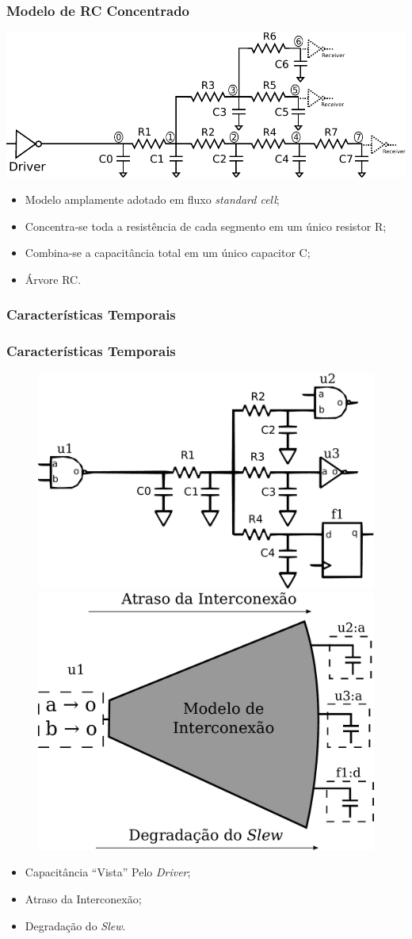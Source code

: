 \documentclass[10pt,a4paper]{beamer}
\begin{document}
				\begin{frame}
					\frametitle{Modelo de RC Concentrado}
					\begin{center}
						\includegraphics[width=\textwidth]{img/lumped_rc.pdf} 
					\end{center}
					\begin{itemize}
						\item Modelo amplamente adotado em fluxo \textit{standard cell};
						\item Concentra-se toda a resistência de cada segmento  em um único resistor R;
						\item Combina-se a capacitância total em um único capacitor C;
						\item Árvore RC.
					\end{itemize}								
				\end{frame}
			
			\subsubsection*{Características Temporais}
			\begin{frame}
				\frametitle{Características Temporais}
				
				
					\begin{figure}
						\subfigure
						{
						\includegraphics[width=0.4 \textwidth]{img/modelagem1.pdf}
						}
						\subfigure
						{
						\includegraphics[width=0.4 \textwidth]{img/modelagem2.pdf}
						}
						
					\end{figure}
					\begin{itemize}
						\item Capacitância ``Vista'' Pelo \textit{Driver};
						\item Atraso da Interconexão;
						\item Degradação do \textit{Slew}. 		
					\end{itemize}
			\end{frame}
	
\end{document}
